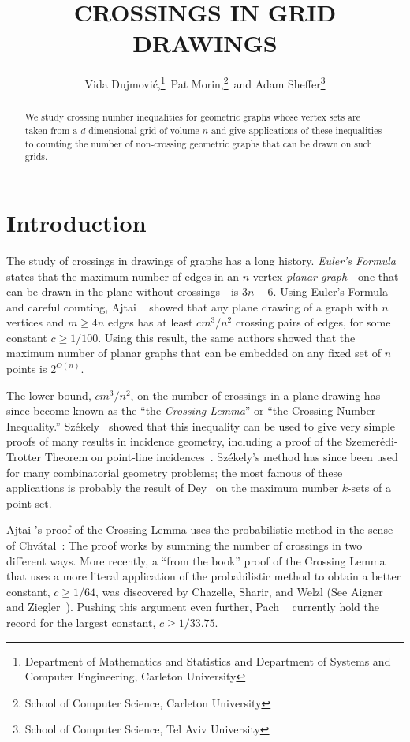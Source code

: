 \documentclass{patmorin}
\title{\MakeUppercase{Crossings in Grid Drawings}}
\author{%
  Vida Dujmovi\'c,\thanks{Department of Mathematics and Statistics
       and Department of Systems and Computer Engineering, 
       Carleton University}\, 
  Pat Morin,\thanks{School of Computer Science, Carleton University}\, and 
  Adam Sheffer\thanks{School of Computer Science, Tel Aviv University}}
\begin{document}
\maketitle

\begin{abstract}
   We study crossing number inequalities for geometric graphs whose
   vertex sets are taken from a $d$-dimensional grid of volume $n$
   and give applications of these inequalities to counting the number
   of non-crossing geometric graphs that can be drawn on such grids.
\end{abstract}

\section{Introduction}

The study of crossings in drawings of graphs has a long history.
\emph{Euler's Formula} states that the maximum number of edges in an $n$
vertex \emph{planar graph}---one that can be drawn in the plane without
crossings---is $3n-6$.  Using Euler's Formula and careful counting, Ajtai
\etal~\cite{ajtai.chvatal.ea:crossing-free} showed that any plane drawing
of a graph with $n$ vertices and $m\ge 4n$ edges has at least $c m^3/n^2$
crossing pairs of edges, for some constant $c\ge 1/100$.  Using this
result, the same authors showed that the maximum number of planar graphs
that can be embedded on any fixed set of $n$ points is $2^{O(n)}$.

The lower bound, $cm^3/n^2$, on the number of crossings
in a plane drawing has since become known as the ``the
\emph{Crossing Lemma}'' or ``the Crossing Number Inequality.''
Sz\'ekely~\cite{szekely:crossing} showed that this inequality can be
used to give very simple proofs of many results in incidence geometry,
including a proof of the Szemer\'edi-Trotter Theorem on point-line
incidences~\cite{szemeredi.trotter:extremal}.  Sz\'ekely's method has
since been used for many combinatorial geometry problems; the most famous
of these applications is probably the result of Dey~\cite{dey:improved}
on the maximum number $k$-sets of a point set.

Ajtai \etal's proof of the Crossing Lemma uses the probabilistic method
in the sense of Chv\'atal~\cite{chvatal:hypergraphs}: The proof works by
summing the number of crossings in two different ways.  More recently, a
``from the book'' proof of the Crossing Lemma that uses a more literal
application of the probabilistic method to obtain a better constant,
$c\ge 1/64$, was discovered by Chazelle, Sharir, and Welzl (See Aigner
and Ziegler~\cite[Chapter~30, Theorem~4]{aigner.ziegler:proofs}).  Pushing
this argument even further, Pach \etal~\cite{pach.radoicic.ea:improving}
currently hold the record for the largest constant, $c\ge 1/33.75$.
\end{document}
